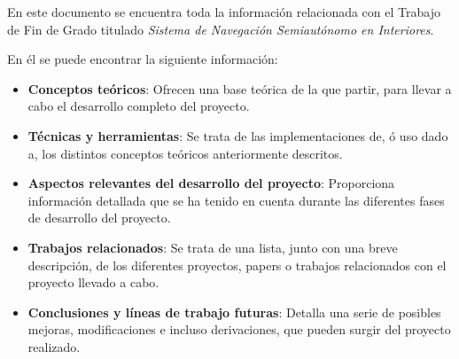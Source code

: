 
\noindent En este documento se encuentra toda la información relacionada con el Trabajo de Fin de Grado titulado \textit{Sistema de Navegación Semiautónomo en Interiores}.

\noindent En él se puede encontrar la siguiente información:
\begin{itemize}
\item \textbf{Conceptos teóricos}: Ofrecen una base teórica de la que partir, para llevar a cabo el desarrollo completo del proyecto.
\item \textbf{Técnicas y herramientas}: Se trata de las implementaciones de, ó uso dado a, los distintos conceptos teóricos anteriormente descritos.
\item \textbf{Aspectos relevantes del desarrollo del proyecto}: Proporciona información detallada que se ha tenido en cuenta durante las diferentes fases de desarrollo del proyecto.
\item \textbf{Trabajos relacionados}: Se trata de una lista, junto con una breve descripción, de los diferentes proyectos, papers o trabajos relacionados con el proyecto llevado a cabo.
\item \textbf{Conclusiones y líneas de trabajo futuras}: Detalla una serie de posibles mejoras, modificaciones e incluso derivaciones, que pueden surgir del proyecto realizado.
\end{itemize}
